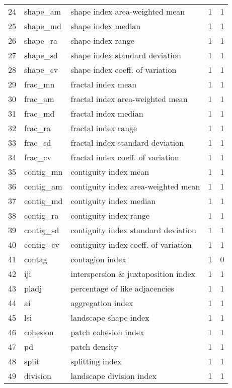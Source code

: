 \begin{longtable}{rllrr}
   24 & shape\_am & shape index area-weighted mean &   1 &   1 \\ 
   25 & shape\_md & shape index median &   1 &   1 \\ 
   26 & shape\_ra & shape index range &   1 &   1 \\ 
   27 & shape\_sd & shape index standard deviation &   1 &   1 \\ 
   28 & shape\_cv & shape index coeff. of variation &   1 &   1 \\ 
   29 & frac\_mn & fractal index mean &   1 &   1 \\ 
   30 & frac\_am & fractal index area-weighted mean &   1 &   1 \\ 
   31 & frac\_md & fractal index median &   1 &   1 \\ 
   32 & frac\_ra & fractal index range &   1 &   1 \\ 
   33 & frac\_sd & fractal index standard deviation &   1 &   1 \\ 
   34 & frac\_cv & fractal index coeff. of variation &   1 &   1 \\ 
   35 & contig\_mn & contiguity index mean &   1 &   1 \\ 
   36 & contig\_am & contiguity index area-weighted mean &   1 &   1 \\ 
   37 & contig\_md & contiguity index median &   1 &   1 \\ 
   38 & contig\_ra & contiguity index range &   1 &   1 \\ 
   39 & contig\_sd & contiguity index standard deviation &   1 &   1 \\ 
   40 & contig\_cv & contiguity index coeff. of variation &   1 &   1 \\ 
   41 & contag & contagion index &   1 &   0 \\ 
   42 & iji & interspersion \& juxtaposition index &   1 &   1 \\ 
   43 & pladj & percentage of like adjacencies &   1 &   1 \\ 
   44 & ai & aggregation index &   1 &   1 \\ 
   45 & lsi & landscape shape index &   1 &   1 \\ 
   46 & cohesion & patch cohesion index &   1 &   1 \\ 
   47 & pd & patch density &   1 &   1 \\ 
   48 & split & splitting index &   1 &   1 \\ 
   49 & division & landscape division index &   1 &   1 \\ 

\end{longtable}
